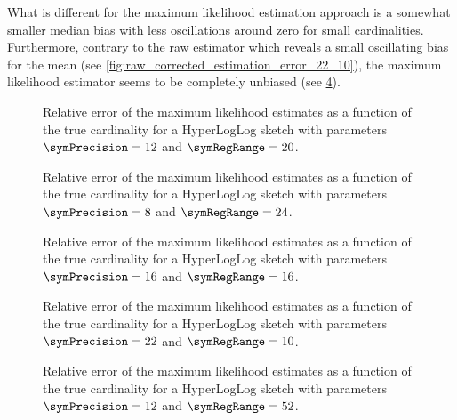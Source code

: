 \documentclass[a4paper]{scrartcl}
\begin{document}
What is different for the maximum likelihood estimation approach is a somewhat smaller median bias with less oscillations around zero for small cardinalities. Furthermore, contrary to the raw estimator which reveals a small oscillating bias for the mean (see \cref{fig:raw_corrected_estimation_error_22_10}), the maximum likelihood estimator seems to be completely unbiased (see \cref{fig:max_likelihood_estimation_error_22_10}).

\begin{figure}
\centering

\caption{Relative error of the maximum likelihood estimates as a function of the true cardinality for a HyperLogLog sketch with parameters $\symPrecision = 12$ and $\symRegRange=20$.}
\label{fig:max_likelihood_estimation_error_12_20}
\end{figure}

\begin{figure}
\centering

\caption{Relative error of the maximum likelihood estimates as a function of the true cardinality for a HyperLogLog sketch with parameters $\symPrecision = 8$ and $\symRegRange=24$.}
\label{fig:max_likelihood_estimation_error_8_24}
\end{figure}

\begin{figure}
\centering

\caption{Relative error of the maximum likelihood estimates as a function of the true cardinality for a HyperLogLog sketch with parameters $\symPrecision = 16$ and $\symRegRange=16$.}
\label{fig:max_likelihood_estimation_error_16_16}
\end{figure}

\begin{figure}
\centering

\caption{Relative error of the maximum likelihood estimates as a function of the true cardinality for a HyperLogLog sketch with parameters $\symPrecision = 22$ and $\symRegRange=10$.}
\label{fig:max_likelihood_estimation_error_22_10}
\end{figure}

\begin{figure}
\centering

\caption{Relative error of the maximum likelihood estimates as a function of the true cardinality for a HyperLogLog sketch with parameters $\symPrecision = 12$ and $\symRegRange=52$.}
\label{fig:max_likelihood_estimation_error_12_52}
\end{figure}
\end{document}
